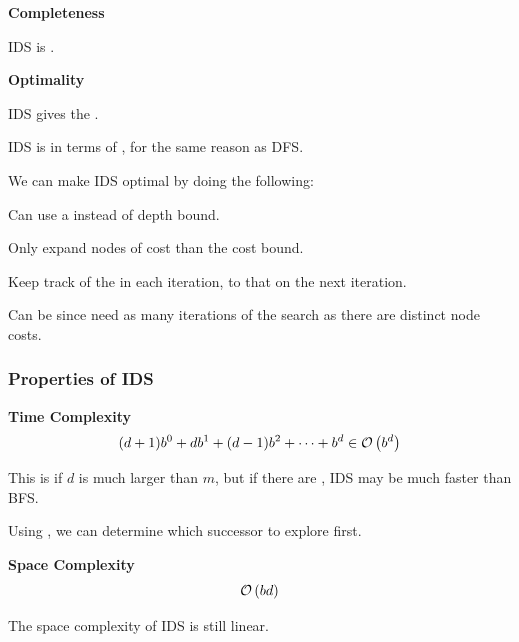 \begin{listu}
    \item \textbf{Completeness}
    
    \begin{listu}
        \item IDS is . 
    \end{listu}

    \item \textbf{Optimality}
    
    \begin{listu}
        \item IDS gives the .

        \item IDS is  in terms of , for the same reason as DFS.
        
        We can make IDS optimal by doing the following:

        \begin{listu}
            \item Can use a  instead of depth bound.
            \item Only expand nodes of cost  than the cost bound. 
            \item Keep track of the  in each iteration,  to that on the next iteration.
            \item Can be  since need as many iterations of the search as there are distinct node costs.
        \end{listu}
    \end{listu}
\end{listu}

\subsubsection{Properties of IDS}

\begin{listu}
    \item \textbf{Time Complexity} \[
        (d+1)b^0 + db^1 + (d-1)b^2 + \cdots + b^d \in \mathcal{O}\left(b^d\right)
    \]

    \begin{listu}
        \item This is  if $d$ is much larger than $m$, but if there are , IDS may be much faster than BFS.
        \item Using , we can determine which successor to explore first. 
    \end{listu}

    \item \textbf{Space Complexity} \[
        \mathcal{O}\left(bd\right)
    \]
    
    The space complexity of IDS is still linear. 
\end{listu}

